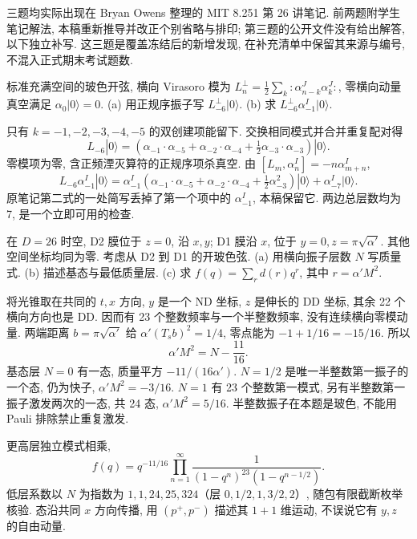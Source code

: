 三题均实际出现在 Bryan Owens 整理的 MIT 8.251 第 26 讲笔记. 前两题附学生笔记解法, 本稿重新推导并改正个别省略与排印; 第三题的公开文件没有给出解答, 以下独立补写. 这三题是覆盖冻结后的新增发现, 在补充清单中保留其来源与编号, 不混入正式期末考试题数.

\begin{exercise}
标准充满空间的玻色开弦, 横向 Virasoro 模为 $L_n^\perp=\frac12\sum_k:\alpha_{n-k}^J\alpha_k^J:$, 零横向动量真空满足 $\alpha_0|0\rangle=0$.
(a) 用正规序振子写 $L_{-6}^\perp|0\rangle$.
(b) 求 $L_{-6}^\perp\alpha_{-1}^I|0\rangle$.
\end{exercise}
\begin{solution}
只有 $k=-1,-2,-3,-4,-5$ 的双创建项能留下. 交换相同模式并合并重复配对得
\[
 L_{-6}|0\rangle=
 \left(\alpha_{-1}\cdot\alpha_{-5}
 +\alpha_{-2}\cdot\alpha_{-4}
 +\tfrac12\alpha_{-3}\cdot\alpha_{-3}\right)|0\rangle.
\]
零模项为零, 含正频湮灭算符的正规序项杀真空. 由 $[L_m,\alpha_n^I]=-n\alpha_{m+n}^I$,
\[
 L_{-6}\alpha_{-1}^I|0\rangle
 =\alpha_{-1}^I\left(\alpha_{-1}\cdot\alpha_{-5}
 +\alpha_{-2}\cdot\alpha_{-4}
 +\tfrac12\alpha_{-3}^2\right)|0\rangle
 +\alpha_{-7}^I|0\rangle.
\]
原笔记第二式的一处简写丢掉了第一个项中的 $\alpha_{-1}^I$, 本稿保留它. 两边总层数均为 7, 是一个立即可用的检查.
\end{solution}

\begin{exercise}
在 $D=26$ 时空, D2 膜位于 $z=0$, 沿 $x,y$; D1 膜沿 $x$, 位于 $y=0,z=\pi\sqrt{\alpha'}$. 其他空间坐标均同为零. 考虑从 D2 到 D1 的开玻色弦.
(a) 用横向振子层数 $N$ 写质量式.
(b) 描述基态与最低质量层.
(c) 求 $f(q)=\sum_r d(r)q^r$, 其中 $r=\alpha'M^2$.
\end{exercise}
\begin{solution}
将光锥取在共同的 $t,x$ 方向, $y$ 是一个 ND 坐标, $z$ 是伸长的 DD 坐标, 其余 22 个横向方向也是 DD. 因而有 23 个整数频率与一个半整数频率, 没有连续横向零模动量. 两端距离 $b=\pi\sqrt{\alpha'}$ 给
$\alpha'(T_sb)^2=1/4$, 零点能为 $-1+1/16=-15/16$. 所以
\[
 \alpha'M^2=N-\frac{11}{16}.
\]
基态层 $N=0$ 有一态, 质量平方 $-11/(16\alpha')$. $N=1/2$ 是唯一半整数第一振子的一个态, 仍为快子, $\alpha'M^2=-3/16$. $N=1$ 有 23 个整数第一模式, 另有半整数第一振子激发两次的一态, 共 24 态, $\alpha'M^2=5/16$. 半整数振子在本题是玻色, 不能用 Pauli 排除禁止重复激发.

更高层独立模式相乘,
\[
 f(q)=q^{-11/16}\prod_{n=1}^\infty
 \frac1{(1-q^n)^{23}(1-q^{n-1/2})}.
\]
低层系数以 $N$ 为指数为 $1,1,24,25,324$（层 $0,1/2,1,3/2,2$）, 随包有限截断枚举核验. 态沿共同 $x$ 方向传播, 用 $(p^+,p^-)$ 描述其 $1+1$ 维运动, 不误说它有 $y,z$ 的自由动量.
\end{solution}

